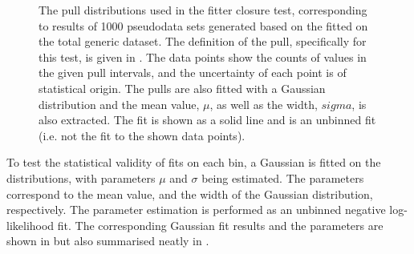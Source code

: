 \begin{figure}[htbp!]
{    }
    \caption{\label{fig:pull_distributions}The pull distributions used in the \Mbc fitter closure test, 
    corresponding to results of 1000 pseudodata sets generated based on the \PDF fitted on the total generic \MC dataset.
    The definition of the pull, specifically for this test, is given in .
    The data points show the counts of values in the given pull intervals, and the uncertainty of each point is of statistical origin.
    The pulls are also fitted with a Gaussian distribution and the mean value, $\mu$, as well as the width, $sigma$, is also extracted.
    The fit is shown as a solid line and is an unbinned fit (i.e. not the fit to the shown data points).
    }
\end{figure}

To test the statistical validity of \Mbc fits on each bin, a Gaussian \PDF is fitted on the distributions, with parameters $\mu$ and $\sigma$ being estimated.
The parameters correspond to the mean value, and the width of the Gaussian distribution, respectively.
The parameter estimation is performed as an unbinned negative log-likelihood fit.
The corresponding Gaussian fit results and the parameters are shown in  but also summarised neatly in .

